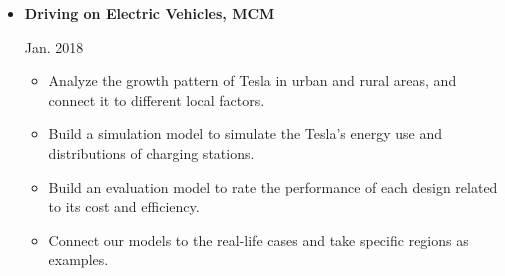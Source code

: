 \documentclass[]{article}
\newcommand{\rightAlign}{38em}
\begin{document}
\begin{itemize}
\item 
\begin{minipage}{\rightAlign}
	\begin{flushleft}                           
		\textbf{Driving on Electric Vehicles, MCM} 
	\end{flushleft} 
\end{minipage}
\begin{minipage}{15em}
	Jan. 2018
\end{minipage}
\begin{itemize}[itemsep=0ex,leftmargin=1cm,rightmargin=.16\textwidth]
	\item Analyze the growth pattern of Tesla in urban and rural areas, and connect it to different local factors.
	\item Build a simulation model to simulate the Tesla's energy use and distributions of charging stations.
	\item Build an evaluation model to rate the performance of each design related to its cost and efficiency.
	\item Connect our models to the real-life cases and take specific regions as examples.
\end{itemize}
		

\end{itemize}
\end{document}
